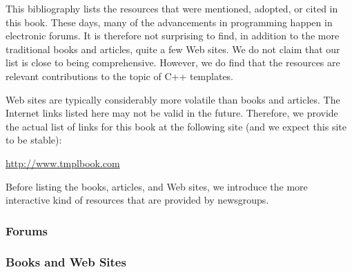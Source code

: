 
This bibliography lists the resources that were mentioned, adopted, or cited in this book. These days, many of the advancements in programming happen in electronic forums. It is therefore not surprising to find, in addition to the more traditional books and articles, quite a few Web sites. We do not claim that our list is close to being comprehensive. However, we do find that the resources are relevant contributions to the topic of C++ templates.

Web sites are typically considerably more volatile than books and articles. The Internet links listed here may not be valid in the future. Therefore, we provide the actual list of links for this book at the following site (and we expect this site to be stable):

\url{http://www.tmplbook.com}

Before listing the books, articles, and Web sites, we introduce the more interactive kind of resources that are provided by newsgroups.


\subsubsection*{Forums}



\subsubsection*{Books and Web Sites}
